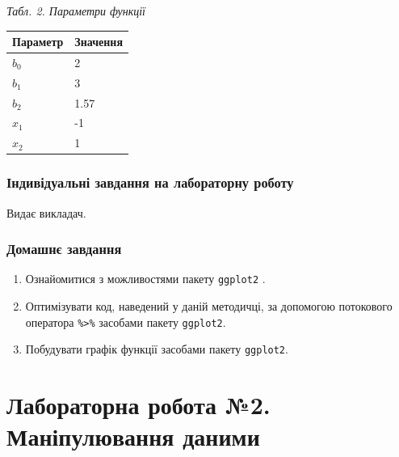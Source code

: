 \documentclass[
]{book}
\begin{document}
\emph{Табл. 2. Параметри функції}

\begin{longtable}[]{@{}ll@{}}
\toprule
Параметр & Значення \\
\midrule
\endhead
\(b_0\) & 2 \\
\(b_1\) & 3 \\
\(b_2\) & 1.57 \\
\(x_1\) & -1 \\
\(x_2\) & 1 \\
\bottomrule
\end{longtable}

\hypertarget{ux456ux43dux434ux438ux432ux456ux434ux443ux430ux43bux44cux43dux456-ux437ux430ux432ux434ux430ux43dux43dux44f-ux43dux430-ux43bux430ux431ux43eux440ux430ux442ux43eux440ux43dux443-ux440ux43eux431ux43eux442ux443}{%
\subsection{Індивідуальні завдання на лабораторну роботу}\label{ux456ux43dux434ux438ux432ux456ux434ux443ux430ux43bux44cux43dux456-ux437ux430ux432ux434ux430ux43dux43dux44f-ux43dux430-ux43bux430ux431ux43eux440ux430ux442ux43eux440ux43dux443-ux440ux43eux431ux43eux442ux443}}

Видає викладач.

\hypertarget{ux434ux43eux43cux430ux448ux43dux454-ux437ux430ux432ux434ux430ux43dux43dux44f}{%
\subsection{Домашнє завдання}\label{ux434ux43eux43cux430ux448ux43dux454-ux437ux430ux432ux434ux430ux43dux43dux44f}}

\begin{enumerate}
\def\labelenumi{\arabic{enumi}.}
\item
  Ознайомитися з можливостями пакету \texttt{ggplot2} \citep{ggplot2}.
\item
  Оптимізувати код, наведений у даній методичці, за допомогою потокового оператора \texttt{\%\textgreater{}\%} засобами пакету \texttt{ggplot2}.
\item
  Побудувати графік функції засобами пакету \texttt{ggplot2}. \citep{A3}
\end{enumerate}

\hypertarget{ux43bux430ux431ux43eux440ux430ux442ux43eux440ux43dux430-ux440ux43eux431ux43eux442ux430-2.-ux43cux430ux43dux456ux43fux443ux43bux44eux432ux430ux43dux43dux44f-ux434ux430ux43dux438ux43cux438}{%
\chapter{Лабораторна робота №2. Маніпулювання даними}\label{ux43bux430ux431ux43eux440ux430ux442ux43eux440ux43dux430-ux440ux43eux431ux43eux442ux430-2.-ux43cux430ux43dux456ux43fux443ux43bux44eux432ux430ux43dux43dux44f-ux434ux430ux43dux438ux43cux438}}
\end{document}
